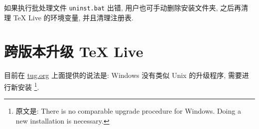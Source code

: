 如果执行批处理文件 \texttt{uninst.bat} 出错,
用户也可手动删除安装文件夹,
之后再清理 \TeX{} Live 的环境变量,
并且清理注册表.

\section{跨版本升级 \TeX{} Live}

目前在 \href{https://www.tug.org/texlive/upgrade.html}{tug.org}
上面提供的说法是:
Windows 没有类似 Unix 的升级程序,
需要进行新安装%
\footnote{原文是: There is no comparable upgrade procedure for Windows.
  Doing a new installation is necessary.}.